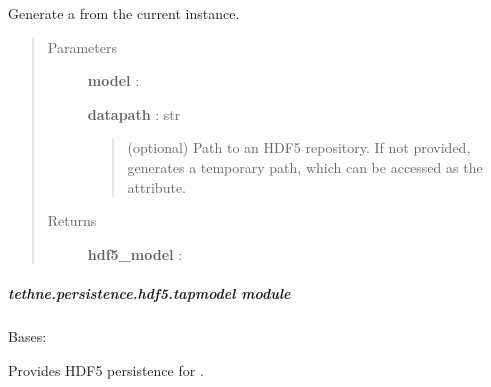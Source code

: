 \documentclass[letterpaper,10pt,english]{sphinxmanual}
\begin{document}
\begin{fulllineitems}
\label{tethne.persistence.hdf5.ldamodel:tethne.persistence.hdf5.ldamodel.to_hdf5}
Generate a {\hyperref[tethne.persistence.hdf5.ldamodel:tethne.persistence.hdf5.ldamodel.HDF5LDAModel]{}} from the current instance.
\begin{quote}\begin{description}
\item[{Parameters}] \leavevmode
\textbf{model} : {\hyperref[tethne.model.corpus.ldamodel:tethne.model.corpus.ldamodel.LDAModel]{}}

\textbf{datapath} : str
\begin{quote}

(optional) Path to an HDF5 repository. If not provided, generates
a temporary path, which can be accessed as the  attribute.
\end{quote}

\item[{Returns}] \leavevmode
\textbf{hdf5\_model} : {\hyperref[tethne.persistence.hdf5.ldamodel:tethne.persistence.hdf5.ldamodel.HDF5LDAModel]{}}

\end{description}\end{quote}

\end{fulllineitems}



\subparagraph{tethne.persistence.hdf5.tapmodel module}
\label{tethne.persistence.hdf5.tapmodel:module-tethne.persistence.hdf5.tapmodel}\label{tethne.persistence.hdf5.tapmodel::doc}\label{tethne.persistence.hdf5.tapmodel:tethne-persistence-hdf5-tapmodel-module}

\begin{fulllineitems}
\label{tethne.persistence.hdf5.tapmodel:tethne.persistence.hdf5.tapmodel.HDF5TAPModel}
Bases: {\hyperref[tethne.model.social.tapmodel:tethne.model.social.tapmodel.TAPModel]{}}

Provides HDF5 persistence for {\hyperref[tethne.model.social.tapmodel:tethne.model.social.tapmodel.TAPModel]{}}.

\end{fulllineitems}
\end{document}
